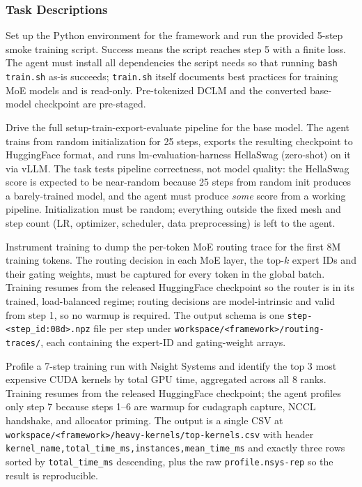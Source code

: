\subsubsection{Task Descriptions}
\label{sec:appendix:tasks:operate-descriptions}

Set up the Python environment for the framework and run the
provided 5-step smoke training script. Success means the script
reaches step 5 with a finite loss. The agent must install all
dependencies the script needs so that running \texttt{bash
train.sh} as-is succeeds; \texttt{train.sh} itself documents best
practices for training MoE models and is read-only. Pre-tokenized
DCLM and the converted base-model checkpoint are pre-staged.

Drive the full setup-train-export-evaluate pipeline for
the base model. The agent trains from random initialization for
25 steps, exports the resulting checkpoint to HuggingFace format,
and runs lm-evaluation-harness HellaSwag (zero-shot) on it via
vLLM. The task tests pipeline correctness, not model quality: the
HellaSwag score is expected to be near-random because 25 steps from
random init produces a barely-trained model, and the agent must
produce \emph{some} score from a working pipeline. Initialization
must be random; everything outside the fixed mesh and step count
(LR, optimizer, scheduler, data preprocessing) is left to the
agent.

Instrument training to dump the per-token MoE routing trace for
the first 8M training tokens. The routing
decision in each MoE layer,
the top-$k$ expert IDs and their gating weights, must be captured
for every token in the global batch. Training resumes from the
released HuggingFace checkpoint so the router is in its trained,
load-balanced regime; routing decisions are model-intrinsic and
valid from step 1, so no warmup is required. The output schema is
one \texttt{step-<step\_id:08d>.npz} file per step under
\texttt{workspace/<framework>/routing-traces/}, each containing the
expert-ID and gating-weight arrays.

Profile a 7-step training run with Nsight Systems
and identify the top 3 most expensive CUDA kernels by total GPU
time, aggregated across all 8 ranks. Training resumes from the
released HuggingFace checkpoint; the agent profiles only step 7
because steps 1--6 are warmup for cudagraph capture, NCCL
handshake, and allocator priming. The output is a single CSV at
\texttt{workspace/<framework>/heavy-kernels/top-kernels.csv} with
header \texttt{kernel\_name,total\_time\_ms,instances,mean\_time\_ms}
and exactly three rows sorted by \texttt{total\_time\_ms}
descending, plus the raw \texttt{profile.nsys-rep} so the result is
reproducible.


